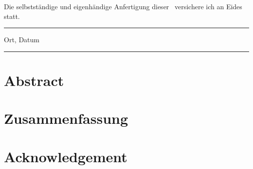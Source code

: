 
Die selbstst\"{a}ndige und eigenh\"{a}ndige Anfertigung dieser \ARTDERARBEIT\
versichere ich an Eides statt.

\vspace{4cm}
\parbox{6cm}{\hrule \strut \centering \small Ort, Datum}
\hfill
\parbox{6cm}{\hrule \strut \centering \small \AUTOR}

\newpage



\section*{Abstract}



\section*{Zusammenfassung}


\newpage



\section*{Acknowledgement}



